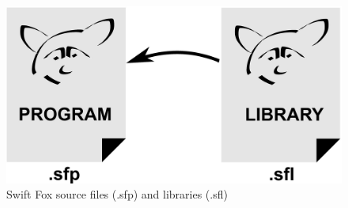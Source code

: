 \documentclass[11pt]{article}
\begin{document}
\begin{figure}[htp]
\centering
        \includegraphics[scale=0.2]{fig/swift_fox_relation.eps}
        \caption{Swift Fox source files (.sfp) and libraries (.sfl)}
        \label{fig:swift_fox_relation}
\end{figure}


\end{document}
